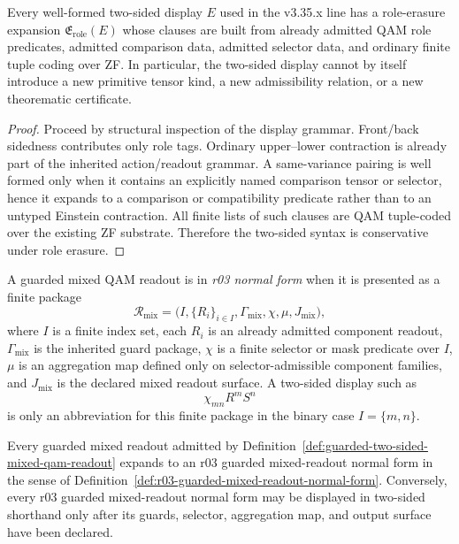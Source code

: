\begin{proposition}\label{prop:r03-role-erasure-normal-form}
Every well-formed two-sided display \(E\) used in the v3.35.x line has a role-erasure expansion \(\mathfrak{E}_{\mathrm{role}}(E)\) whose clauses are built from already admitted QAM role predicates, admitted comparison data, admitted selector data, and ordinary finite tuple coding over ZF.  In particular, the two-sided display cannot by itself introduce a new primitive tensor kind, a new admissibility relation, or a new theorematic certificate.
\end{proposition}

\begin{proof}
Proceed by structural inspection of the display grammar.  Front/back sidedness contributes only role tags.  Ordinary upper--lower contraction is already part of the inherited action/readout grammar.  A same-variance pairing is well formed only when it contains an explicitly named comparison tensor or selector, hence it expands to a comparison or compatibility predicate rather than to an untyped Einstein contraction.  All finite lists of such clauses are QAM tuple-coded over the existing ZF substrate.  Therefore the two-sided syntax is conservative under role erasure.
\end{proof}

\begin{definition}\label{def:r03-guarded-mixed-readout-normal-form}
A guarded mixed QAM readout is in \emph{r03 normal form} when it is presented as a finite package
\[
\mathcal R_{\mathrm{mix}}
=
\bigl(I,\{R_i\}_{i\in I},\Gamma_{\mathrm{mix}},\chi,\mu,J_{\mathrm{mix}}\bigr),
\]
where \(I\) is a finite index set, each \(R_i\) is an already admitted component readout, \(\Gamma_{\mathrm{mix}}\) is the inherited guard package, \(\chi\) is a finite selector or mask predicate over \(I\), \(\mu\) is an aggregation map defined only on selector-admissible component families, and \(J_{\mathrm{mix}}\) is the declared mixed readout surface.  A two-sided display such as
\[
\chi_{mn}R^mS^n
\]
is only an abbreviation for this finite package in the binary case \(I=\{m,n\}\).
\end{definition}

\begin{proposition}\label{prop:r03-mixed-readout-normal-form-expansion}
Every guarded mixed readout admitted by Definition~\ref{def:guarded-two-sided-mixed-qam-readout} expands to an r03 guarded mixed-readout normal form in the sense of Definition~\ref{def:r03-guarded-mixed-readout-normal-form}.  Conversely, every r03 guarded mixed-readout normal form may be displayed in two-sided shorthand only after its guards, selector, aggregation map, and output surface have been declared.
\end{proposition}

